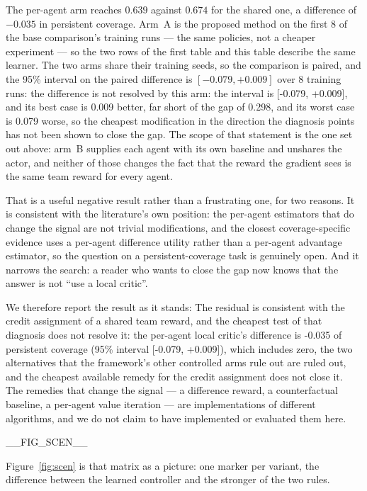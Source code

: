 
The per-agent arm reaches $0.639$ against $0.674$ for
the shared one, a difference of $-0.035$ in persistent coverage.
Arm~A is the proposed method on the first 8 of the base
comparison's training runs --- the same policies, not a cheaper experiment
--- so the two rows of the first table and this table describe the same
learner.
The two arms share their training seeds, so the comparison is paired, and
the 95\% interval on the paired difference is $[-0.079, +0.009]$ over
8 training runs: the difference is not resolved by this arm: the interval is [-0.079, +0.009], and its best case is 0.009 better, far short of the gap of 0.298, and its worst case is 0.079 worse, so the cheapest modification in the direction the diagnosis points has not been shown to close the gap.  The scope of that
statement is the one set out above: arm~B
supplies each agent with its own baseline and unshares the actor, and
neither of those changes the fact that the reward the gradient sees is the
same team reward for every agent.

That is a useful negative result rather than a frustrating one, for two
reasons.  It is consistent with the literature's own position: the
per-agent estimators that do change the signal are not trivial
modifications, and the closest coverage-specific evidence
\cite{sun2023} uses a per-agent difference utility rather than a per-agent
advantage estimator, so the question on a persistent-coverage task is
genuinely open.  And it narrows the search: a reader who wants to close
the gap now knows that the answer is not ``use a local critic''.

We therefore report the result as it stands: The residual is consistent with the credit assignment of a shared team reward, and the cheapest test of that diagnosis does not resolve it: the per-agent local critic's difference is -0.035 of persistent coverage (95\% interval [-0.079, +0.009]), which includes zero, the two
alternatives that the framework's other controlled arms rule out are ruled
out, and the cheapest available remedy for the credit assignment does not
close it.  The remedies that change the
signal --- a difference reward, a counterfactual baseline, a per-agent
value iteration --- are implementations of different algorithms, and we do
not claim to have implemented or evaluated them here.


__FIG_SCEN__

Figure~\ref{fig:scen} is that matrix as a picture: one marker per variant, the difference between the learned controller and the stronger of the two rules.

